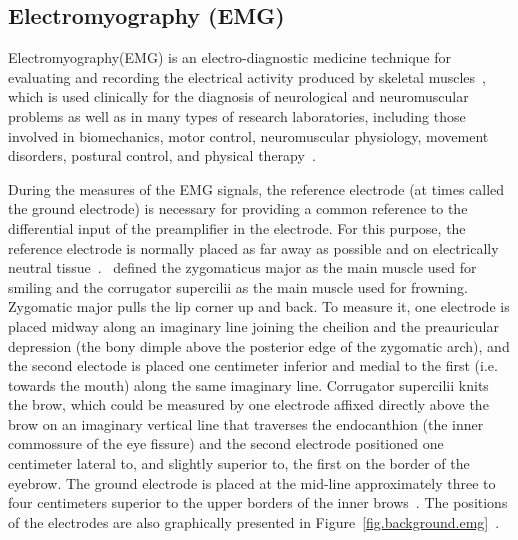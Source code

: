\subsection{Electromyography (EMG)}\label{subsec.background.emg}

Electromyography(EMG) is an electro-diagnostic medicine technique for evaluating and recording the electrical activity produced by skeletal muscles~\citep{robertson2013research}, which is used clinically for the diagnosis of neurological and neuromuscular problems as well as in many types of research laboratories, including those involved in biomechanics, motor control, neuromuscular physiology, movement disorders, postural control, and physical therapy~\citep{reaz2006techniques}.

During the measures of the EMG signals, the reference electrode (at times called the ground electrode) is necessary for providing a common reference
to the differential input of the preamplifier in the electrode. For this purpose, the reference electrode
is normally placed as far away as possible and on electrically neutral tissue~\citep{de2002surface}.~\citeauthor{fridlund1986guidelines} defined the zygomaticus major as the main muscle used for smiling and the corrugator supercilii as the main muscle used for frowning. Zygomatic major pulls the lip corner up and back. To measure it, one electrode is placed midway along an imaginary line joining the cheilion and the preauricular depression (the bony dimple above the posterior edge of the zygomatic arch), and the second electode is placed one centimeter inferior and medial to the first (i.e. towards the mouth) along the same imaginary line. Corrugator supercilii knits the brow, which could be measured by one electrode affixed directly above the brow on an imaginary vertical line that traverses the endocanthion (the inner commossure of the eye fissure) and the second electrode positioned one centimeter lateral to, and slightly superior to, the first on the border of the eyebrow. The ground electrode is placed at the mid-line approximately three to four centimeters superior to the upper borders of the inner brows~\citep{fridlund1986guidelines}. The positions of the electrodes are also graphically presented in Figure~\ref{fig.background.emg}~\citep{fridlund1986guidelines}.

